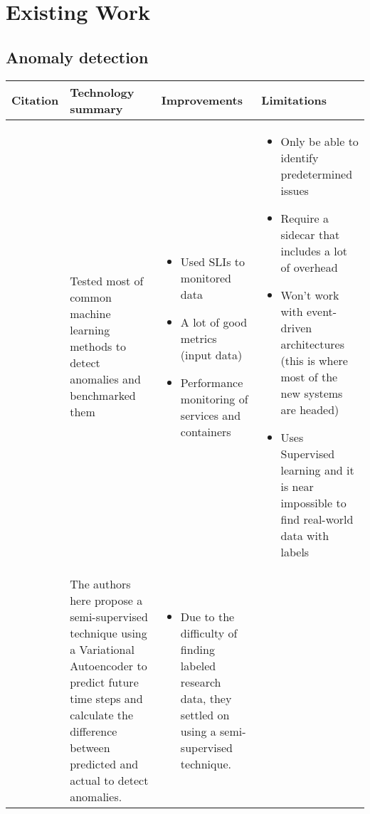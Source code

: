 \section{Existing Work}

\subsection{Anomaly detection}

\begin{longtable}{| p{20mm} | p{43mm} | p{43mm} | p{43mm} |}
\hline
  \textbf{Citation} &
  \textbf{Technology summary} &
  \textbf{Improvements} &
  \textbf{Limitations} \\ \hline
  \cite{du2018anomaly} &
  Tested most of common machine learning methods to detect anomalies and benchmarked them &
  \vspace{-8mm}
  \begin{itemize}[leftmargin=*,noitemsep,nolistsep] 
    \item Used SLIs to monitored data
    \item A lot of good metrics (input data)
    \item Performance monitoring of services and containers
  \vspace{-7mm}
  \end{itemize} &
  \vspace{-8mm}
  \begin{itemize}[leftmargin=*,noitemsep,nolistsep] 
    \item Only be able to identify predetermined issues
    \item Require a sidecar that includes a lot of overhead
    \item Won't work with event-driven architectures (this is where most of the new systems are headed)
    \item Uses Supervised learning and it is near impossible to find real-world data with labels
  \vspace{-7mm}
  \end{itemize} \\ \hline
  \cite{kumarage2018anomaly} &
  The authors here propose a semi-supervised technique using a Variational Autoencoder to predict future time steps and calculate the difference between predicted and actual to detect anomalies. &
  \vspace{-8mm}
  \begin{itemize}[leftmargin=*,noitemsep,nolistsep] 
    \item Due to the difficulty of finding labeled research data, they settled on using a semi-supervised technique.

\end{itemize}
\end{longtable}
